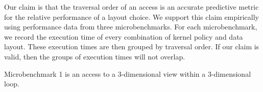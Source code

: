 \documentclass{article}
\newcommand{\todo}[1]{{\textcolor{red}{{\tt{TODO:}}\,\,#1 }}}
\begin{document}
Our claim is that the traversal order of an access is an accurate predictive metric for the relative performance of a layout choice. 
We support this claim empirically using performance data from three microbenchmarks.
For each microbenchmark, we record the execution time of every combination of kernel policy and data layout. 
These execution times are then grouped by traversal order.
If our claim is valid, then the groups of execution times will not overlap.

Microbenchmark 1 is an access to a 3-dimensional view within a 3-dimensional loop. 






\begin{comment}

\todo{motivate.}
We start with a simple example. A 3-dimensional kernel that makes a single access to a 3 dimensional View. As a RAJA kernel, it may look like the following.
\begin{lstlisting}
kernel<3D_POLICY>(loop_bounds, [=](auto i, auto j, auto k) 
  {
      A(k,j,i) = foo(i,j,k);
  });
\end{lstlisting}

There are two variables relevant to the discussion: the policy \verb.3D_POLICY. and the layout of \verb.A..

\subsection{Kernel Policies}
The policy determines how the kernel is executed, from the order of the iteration to the schedule at each level. One possible definition of the policy is:
\begin{lstlisting}
using 3D_POLICY = KernelPolicy<
  statement::For<0,omp_parallel_for_exec,
    statement::For<1,loop_exec,
      statement::For<2, loop_exec,
        statement::Lambda<0>
      >
    >
  >
>;
\end{lstlisting}
This policy defines an execution schedule that iterates over the \verb.i. dimension in parallel, then over the \verb.j. and \verb.k. dimensions sequentially. 

Another possible definition of the policy is:
\begin{lstlisting}
    using 3D_POLICY = KernelPolicy<
      statement::For<1,omp_parallel_for_exec,
        statement::For<0,loop_exec,
          statement::For<2, loop_exec,
            statement::Lambda<0>
          >
        >
      >
    >;
\end{lstlisting}
This policy defines a slightly different execution schedule. 
Without having to change the order of the arguments in the lambda describing the loop body, this policy effectively implements a loop interchange transformation between the \verb.i. and \verb.j. dimension. 
First, it iterates over the \verb.j. dimension in parallel, then over \verb.i. and \verb.k..

For an $n$-dimensional kernel, there are $n!$ different possible dimension orderings of its kernel policy. 






Claim: Traversal order is an indicator of performance. 

\end{comment}
\end{document}
